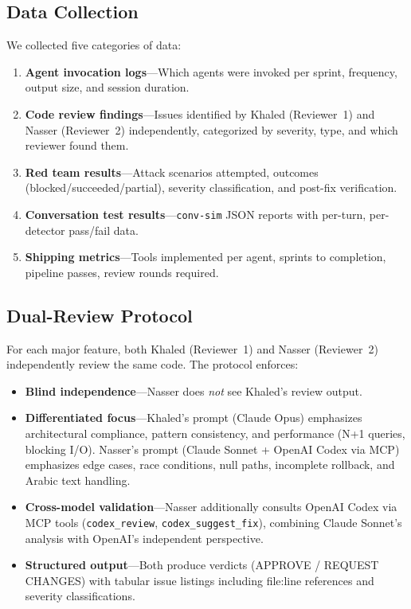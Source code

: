 \documentclass[11pt,a4paper]{article}
\begin{document}
\subsection{Data Collection}

We collected five categories of data:

\begin{enumerate}[leftmargin=*]
    \item \textbf{Agent invocation logs}---Which agents were invoked per sprint, frequency, output size, and session duration.
    \item \textbf{Code review findings}---Issues identified by Khaled (Reviewer~1) and Nasser (Reviewer~2) independently, categorized by severity, type, and which reviewer found them.
    \item \textbf{Red team results}---Attack scenarios attempted, outcomes (blocked/succeeded/partial), severity classification, and post-fix verification.
    \item \textbf{Conversation test results}---\texttt{conv-sim} JSON reports with per-turn, per-detector pass/fail data.
    \item \textbf{Shipping metrics}---Tools implemented per agent, sprints to completion, pipeline passes, review rounds required.
\end{enumerate}

\subsection{Dual-Review Protocol}
\label{sec:dualprotocol}

For each major feature, both Khaled (Reviewer~1) and Nasser (Reviewer~2) independently review the same code. The protocol enforces:

\begin{itemize}[leftmargin=*]
    \item \textbf{Blind independence}---Nasser does \textit{not} see Khaled's review output.
    \item \textbf{Differentiated focus}---Khaled's prompt (Claude Opus) emphasizes architectural compliance, pattern consistency, and performance (N+1 queries, blocking I/O). Nasser's prompt (Claude Sonnet + OpenAI Codex via MCP) emphasizes edge cases, race conditions, null paths, incomplete rollback, and Arabic text handling.
    \item \textbf{Cross-model validation}---Nasser additionally consults OpenAI Codex via MCP tools (\texttt{codex\_review}, \texttt{codex\_suggest\_fix}), combining Claude Sonnet's analysis with OpenAI's independent perspective.
    \item \textbf{Structured output}---Both produce verdicts (APPROVE / REQUEST CHANGES) with tabular issue listings including file:line references and severity classifications.
\end{itemize}
\end{document}
